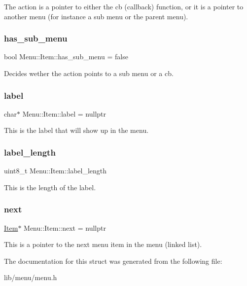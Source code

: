 The action is a pointer to either the cb (callback) function, or it is a pointer to another menu (for instance a sub menu or the parent menu). \hypertarget{struct_menu_1_1_item_a5c9895a137458b9a12dafd447ac7430b}{}\label{struct_menu_1_1_item_a5c9895a137458b9a12dafd447ac7430b} 
\subsubsection{\texorpdfstring{has\+\_\+sub\+\_\+menu}{has\_sub\_menu}}
{\footnotesize\ttfamily bool Menu\+::\+Item\+::has\+\_\+sub\+\_\+menu = false}

Decides wether the action points to a sub menu or a cb. \hypertarget{struct_menu_1_1_item_a378723382fc64c752a85ffe6fec9707e}{}\label{struct_menu_1_1_item_a378723382fc64c752a85ffe6fec9707e} 
\subsubsection{\texorpdfstring{label}{label}}
{\footnotesize\ttfamily char$\ast$ Menu\+::\+Item\+::label = nullptr}

This is the label that will show up in the menu. \hypertarget{struct_menu_1_1_item_a46749d046bbbde8d5308848d5394c2dc}{}\label{struct_menu_1_1_item_a46749d046bbbde8d5308848d5394c2dc} 
\subsubsection{\texorpdfstring{label\+\_\+length}{label\_length}}
{\footnotesize\ttfamily uint8\+\_\+t Menu\+::\+Item\+::label\+\_\+length}

This is the length of the label. \hypertarget{struct_menu_1_1_item_aadcc1e4e824296c6b72ac7d053f06869}{}\label{struct_menu_1_1_item_aadcc1e4e824296c6b72ac7d053f06869} 
\subsubsection{\texorpdfstring{next}{next}}
{\footnotesize\ttfamily \hyperlink{struct_menu_1_1_item}{Item}$\ast$ Menu\+::\+Item\+::next = nullptr}

This is a pointer to the next menu item in the menu (linked list). 

The documentation for this struct was generated from the following file\+:\begin{DoxyCompactItemize}
\item 
lib/menu/menu.\+h\end{DoxyCompactItemize}
